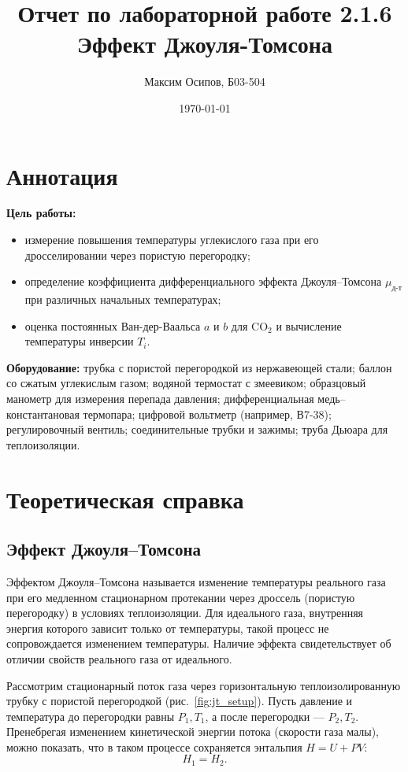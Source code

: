 \documentclass[a4paper, 12pt]{article}
\title{Отчет по лабораторной работе 2.1.6 \\ Эффект Джоуля-Томсона}
\author{Максим Осипов, Б03-504}
\date{\today}
\begin{document}
\maketitle

\section*{Аннотация}
\textbf{Цель работы:}
\begin{itemize}
    \item измерение повышения температуры углекислого газа при его дросселировании через пористую перегородку;
    \item определение коэффициента дифференциального эффекта Джоуля–Томсона \(\mu_{\text{д-т}}\) при различных начальных температурах;
    \item оценка постоянных Ван-дер-Ваальса \(a\) и \(b\) для \(\text{CO}_2\) и вычисление температуры инверсии \(T_i\).
\end{itemize}

\textbf{Оборудование:} трубка с пористой перегородкой из нержавеющей стали; баллон со сжатым углекислым газом; водяной термостат с змеевиком; образцовый манометр для измерения перепада давления; дифференциальная медь–константановая термопара; цифровой вольтметр (например, В7-38); регулировочный вентиль; соединительные трубки и зажимы; труба Дьюара для теплоизоляции.

\section{Теоретическая справка}

\subsection{Эффект Джоуля–Томсона}
Эффектом Джоуля–Томсона называется изменение температуры реального газа при его медленном стационарном протекании через дроссель (пористую перегородку) в условиях теплоизоляции. Для идеального газа, внутренняя энергия которого зависит только от температуры, такой процесс не сопровождается изменением температуры. Наличие эффекта свидетельствует об отличии свойств реального газа от идеального.

Рассмотрим стационарный поток газа через горизонтальную теплоизолированную трубку с пористой перегородкой (рис.~\ref{fig:jt_setup}). Пусть давление и температура до перегородки равны \(P_1, T_1\), а после перегородки — \(P_2, T_2\). Пренебрегая изменением кинетической энергии потока (скорости газа малы), можно показать, что в таком процессе сохраняется энтальпия \(H = U + PV\):
\[
H_1 = H_2. \tag{1}
\]
\end{document}
